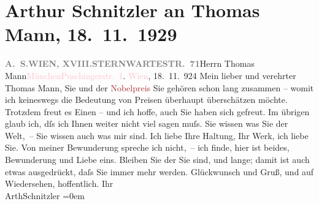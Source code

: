 

               \section[Arthur Schnitzler an Thomas Mann, 18. 11. 1929]{ Arthur Schnitzler an Thomas Mann, 18. 11. 1929}\nopagebreak{}\rehead{ }\normalsize\beginnumbering{} \toendnotes[C]{\smallbreak\pagebreak[2]} 
\pstart{}{\pb}\textcolor{gray}{\textbf{A. S.}}\pend{}\pstart{}\textcolor{pink}{\textcolor{gray}{\textbf{WIEN, XVIII.}}}{}\ledrightnote{\textcolor{pink}{XVIII., Währing}}\pend{}\pstart{}\textcolor{pink}{\textcolor{gray}{\textbf{STERNWARTESTR. 71}}}{}\ledrightnote{\textcolor{pink}{Sternwartestraße}}\pend{}{\bigskip}\pstart{}{\pb}Herrn Thomas Mann\pend{}\pstart{}\textcolor{pink}{München}{}\ledrightnote{\textcolor{pink}{München}}\pend{}\pstart{}\textcolor{pink}{Puschingerstr. 1}{}\ledrightnote{\textcolor{pink}{Poschingerstraße}}.\pend{}{\bigskip}\pstart
           \raggedleft{}{\pb}\textcolor{pink}{Wien}{}\ledrightnote{\textcolor{pink}{Wien}}, 18. 11. 924\pend
           \pstart{}Mein lieber und verehrter Thomas Mann,\pend\pstart
           Sie und der \textcolor{brown}{Nobelpreis}{}\ledrightnote{\textcolor{brown}{Nobelpreis}} Sie gehören schon lang
                    zusammen – womit ich keineswegs die Bedeutung von Preisen überhaupt überschätzen
                    möchte. Trotzdem freut es Einen – und ich hoffe, auch Sie haben sich
                    gefreut.\pend
           \pstart
           Im übrigen glaub ich, dſs ich Ihnen weiter nicht viel sagen muſs. Sie wissen was
                    Sie der Welt, – Sie wissen auch was {\pb}mir sind. Ich liebe Ihre Haltung, Ihr Werk, ich liebe Sie. Von meiner
                    Bewunderung spreche ich nicht, – ich finde, hier ist beides, Bewunderung und
                    Liebe eins.\pend
           \pstart
           Bleiben Sie der Sie sind, und lange; damit ist auch etwas ausgedrückt, daſs Sie
                    immer mehr werden.\pend
           \pstart
           Glückwunsch und Gruß, und auf Wiedersehen, hoffentlich.\pend
           \pstart
           Ihr{\\[\baselineskip]}\spacefill\mbox{ArthSchnitzler}\pend
           \leftskip=0em{}\endnumbering{}  
      
